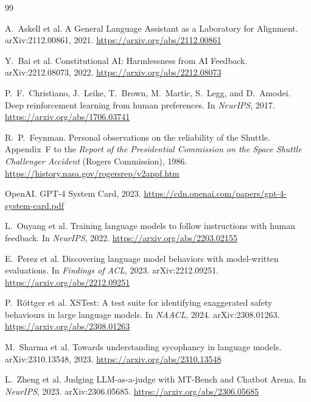 \documentclass[11pt]{article}
\begin{document}
\begin{thebibliography}{99}

A.~Askell et al.
\newblock A General Language Assistant as a Laboratory for Alignment.
\newblock arXiv:2112.00861, 2021.
\newblock \url{https://arxiv.org/abs/2112.00861}

Y.~Bai et al.
\newblock Constitutional AI: Harmlessness from AI Feedback.
\newblock arXiv:2212.08073, 2022.
\newblock \url{https://arxiv.org/abs/2212.08073}

P.~F.~Christiano, J.~Leike, T.~Brown, M.~Martic, S.~Legg, and D.~Amodei.
\newblock Deep reinforcement learning from human preferences.
\newblock In \emph{NeurIPS}, 2017.
\newblock \url{https://arxiv.org/abs/1706.03741}

R.~P.~Feynman.
\newblock Personal observations on the reliability of the Shuttle.
\newblock Appendix~F to the \emph{Report of the Presidential Commission on the Space Shuttle Challenger Accident} (Rogers Commission), 1986.
\newblock \url{https://history.nasa.gov/rogersrep/v2appf.htm}

OpenAI.
\newblock GPT-4 System Card, 2023.
\newblock \url{https://cdn.openai.com/papers/gpt-4-system-card.pdf}

L.~Ouyang et al.
\newblock Training language models to follow instructions with human feedback.
\newblock In \emph{NeurIPS}, 2022.
\newblock \url{https://arxiv.org/abs/2203.02155}

E.~Perez et al.
\newblock Discovering language model behaviors with model-written evaluations.
\newblock In \emph{Findings of ACL}, 2023. arXiv:2212.09251.
\newblock \url{https://arxiv.org/abs/2212.09251}

P.~R\"ottger et al.
\newblock XSTest: A test suite for identifying exaggerated safety behaviours in large language models.
\newblock In \emph{NAACL}, 2024. arXiv:2308.01263.
\newblock \url{https://arxiv.org/abs/2308.01263}

M.~Sharma et al.
\newblock Towards understanding sycophancy in language models.
\newblock arXiv:2310.13548, 2023.
\newblock \url{https://arxiv.org/abs/2310.13548}

L.~Zheng et al.
\newblock Judging LLM-as-a-judge with MT-Bench and Chatbot Arena.
\newblock In \emph{NeurIPS}, 2023. arXiv:2306.05685.
\newblock \url{https://arxiv.org/abs/2306.05685}

\end{thebibliography}
\end{document}
